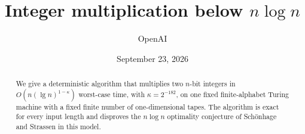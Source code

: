 \documentclass[11pt]{article}
\title{Integer multiplication below \texorpdfstring{$n\log n$}{n log n}}
\author{OpenAI}
\date{September 23, 2026}
\theoremstyle{definition}
\begin{document}
\maketitle
\begin{abstract}
We give a deterministic algorithm that multiplies two $n$-bit integers
in $O(n(\lg n)^{1-\kappa})$ worst-case time, with
$\kappa=2^{-182}$, on one fixed finite-alphabet Turing machine with a
fixed finite number of one-dimensional tapes. The algorithm is exact
for every input length and disproves the $n\log n$ optimality conjecture
of Sch\"onhage and Strassen in this model.
\end{abstract}
\tableofcontents
\clearpage










\appendix



\end{document}

